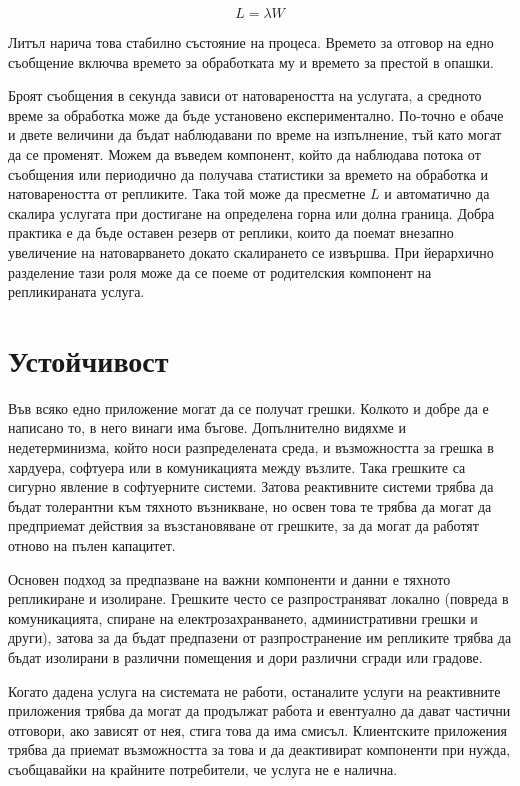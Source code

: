 \begin{equation}
L = \lambda W
\end{equation}

Литъл нарича това стабилно състояние на процеса. Времето за отговор на едно съобщение включва времето за обработката му и времето за престой в опашки.

Броят съобщения в секунда зависи от натовареността на услугата, а средното време за обработка може да бъде установено експериментално. По-точно е обаче и двете величини да бъдат наблюдавани по време на изпълнение, тъй като могат да се променят. Можем да въведем компонент, който да наблюдава потока от съобщения или периодично да получава статистики за времето на обработка и натовареността от репликите. Така той може да пресметне $L$ и автоматично да скалира услугата при достигане на определена горна или долна граница. Добра практика е да бъде оставен резерв от реплики, които да поемат внезапно увеличение на натоварването докато скалирането се извършва. При йерархично разделение тази роля може да се поеме от родителския компонент на репликираната услуга.

\section{Устойчивост}

Във всяко едно приложение могат да се получат грешки. Колкото и добре да е написано то, в него винаги има бъгове. Допълнително видяхме и недетерминизма, който носи разпределената среда, и възможността за грешка в хардуера, софтуера или в комуникацията между възлите. Така грешките са сигурно явление в софтуерните системи. Затова реактивните системи трябва да бъдат толерантни към тяхното възникване, но освен това те трябва да могат да предприемат действия за възстановяване от грешките, за да могат да работят отново на пълен капацитет.

Основен подход за предпазване на важни компоненти и данни е тяхното репликиране и изолиране. Грешките често се разпространяват локално (повреда в комуникацията, спиране на електрозахранването, административни грешки и други), затова за да бъдат предпазени от разпространение им репликите трябва да бъдат изолирани в различни помещения и дори различни сгради или градове.

Когато дадена услуга на системата не работи, останалите услуги на реактивните приложения трябва да могат да продължат работа и евентуално да дават частични отговори, ако зависят от нея, стига това да има смисъл. Клиентските приложения трябва да приемат възможността за това и да деактивират компоненти при нужда, съобщавайки на крайните потребители, че услуга не е налична.

